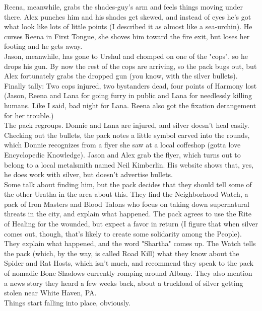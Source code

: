 \documentclass[oneside,12pt]{book}
\begin{document}
\begin{flushleft}
Reena, meanwhile, grabs the shades-guy's arm and feels things moving under there. Alex punches him and his shades get skewed, and instead of eyes he's got what look like lots of little points (I described it as almost like a sea-urchin). He curses Reena in First Tongue, she shoves him toward the fire exit, but loses her footing and he gets away.\\

Jason, meanwhile, has gone to Urshul and chomped on one of the "cops", so he drops his gun. By now the rest of the cops are arriving, so the pack bugs out, but Alex fortunately grabs the dropped gun (you know, with the silver bullets).\\

Finally tally: Two cops injured, two bystanders dead, four points of Harmony lost (Jason, Reena and Lana for going furry in public and Lana for needlessly killing humans. Like I said, bad night for Lana. Reena also got the fixation derangement for her trouble.)\\


The pack regroups. Donnie and Lana are injured, and silver doesn't heal easily. Checking out the bullets, the pack notes a little symbol carved into the rounds, which Donnie recognizes from a flyer she saw at a local coffeshop (gotta love Encyclopedic Knowledge). Jason and Alex grab the flyer, which turns out to belong to a local metalsmith named Neil Kimberlin. His website shows that, yes, he does work with silver, but doesn't advertise bullets.\\

Some talk about finding him, but the pack decides that they should tell some of the other Uratha in the area about this. They find the Neighborhood Watch, a pack of Iron Masters and Blood Talons who focus on taking down supernatural threats in the city, and explain what happened. The pack agrees to use the Rite of Healing for the wounded, but expect a favor in return (I figure that when silver comes out, though, that's likely to create some solidarity among the People). They explain what happened, and the word "Shartha" comes up. The Watch tells the pack (which, by the way, is called Road Kill) what they know about the Spider and Rat Hosts, which isn't much, and recommend they speak to the pack of nomadic Bone Shadows currently romping around Albany. They also mention a news story they heard a few weeks back, about a truckload of silver getting stolen near White Haven, PA.\\

Things start falling into place, obviously.\\



\end{flushleft}
\end{document}
